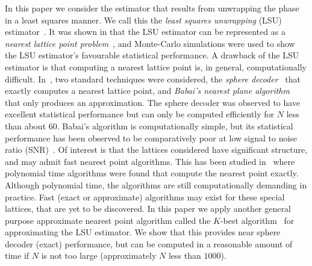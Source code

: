 \documentclass[journal]{IEEEtran}
\begin{document}
In this paper we consider the estimator that results from unwrapping the phase in a least squares manner.  We call this the \emph{least squares unwrapping} (LSU) estimator~\cite{McKilliam2009asilomar_polyest_lattice, McKilliamFrequencyEstimationByPhaseUnwrapping2009,McKilliam2010thesis,McKilliam_polyphase_est_icassp_2011}.  It was shown in \cite{McKilliam2009asilomar_polyest_lattice, McKilliamFrequencyEstimationByPhaseUnwrapping2009} that the LSU estimator can be represented as a \emph{nearest lattice point problem}~\cite{Agrell2002}, and Monte-Carlo simulations were used to show the LSU estimator's favourable statistical performance. %
A drawback of the LSU estimator is that computing a nearest lattice point is, in general, computationally difficult.  In~\cite{McKilliam2009asilomar_polyest_lattice}, two standard techniques were considered, the \emph{sphere decoder}~\cite{Pohst_sphere_decoder_1981,Viterbo_sphere_decoder_1999,Agrell2002} that exactly computes a nearest lattice point, and \emph{Babai's nearest plane algorithm}~\cite{Babai1986} that only produces an approximation. The sphere decoder was observed to have excellent statistical performance but can only be computed efficiently for $N$ less than about $60$.  Babai's algorithm is computationally simple, but its statistical performance has been observed to be comparatively poor at low signal to noise ratio (SNR)~\cite{McKilliam2009asilomar_polyest_lattice}. Of interest is that the lattices considered have significant structure, and may admit fast nearest point algorithms.  This has been studied in~\cite{McKilliam2010thesis} where polynomial time algorithms were found that compute the nearest point exactly.  Although polynomial time, the algorithms are still computationally demanding in practice.  Fast (exact or approximate) algorithms may exist for these special lattices, that are yet to be discovered.  In this paper we apply another general purpose approximate nearest point algorithm called the $K$-best algorithm~\cite{Baro_list_sphere_dec_2003,Zhan2006_K_best_sphere_decoder,Mondal_Kbest_again_2009} for approximating the LSU estimator.  We show that this provides near sphere decoder (exact) performance, but can be computed in a reasonable amount of time if $N$ is not too large (approximately $N$ less than $1000$).  %
\end{document}
